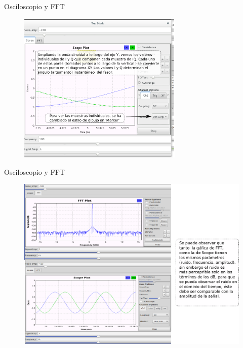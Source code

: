\begin{frame}{Osciloscopio y FFT}
\begin{figure}[H]
\vspace{-3mm}
\centering
\includegraphics[width=0.7\textwidth]{lab2/pdf/lab2_15.pdf}
\end{figure}
\end{frame}

\begin{frame}{Osciloscopio y FFT}
\begin{figure}[H]
\centering
\includegraphics[width=\textwidth, height=0.58\textwidth]{lab2/pdf/lab2_16.pdf}
\end{figure}
\end{frame}
